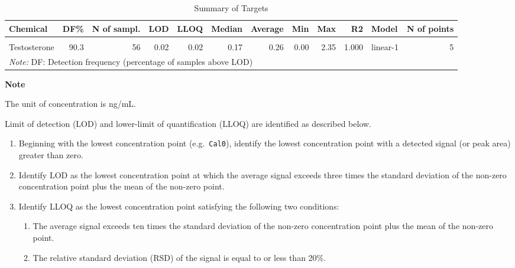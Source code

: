 \documentclass[
  a4paper,
  landscape]{report}
\providecommand{\tightlist}{%
  \setlength{\itemsep}{0pt}\setlength{\parskip}{0pt}}\usepackage{longtable,booktabs,array}
\begin{document}
\begin{longtable}[t]{lrrrrrrrrrlr}
\caption{Summary of Targets}\\
\toprule
Chemical & DF\% & N of sampl. & LOD & LLOQ & Median & Average & Min & Max & R2 & Model & N of points\\
\midrule
\cellcolor{gray!10}{Progesterone} & \cellcolor{gray!10}{100.0} & \cellcolor{gray!10}{62} & \cellcolor{gray!10}{0.02} & \cellcolor{gray!10}{0.02} & \cellcolor{gray!10}{15.99} & \cellcolor{gray!10}{48.46} & \cellcolor{gray!10}{0.16} & \cellcolor{gray!10}{236.59} & \cellcolor{gray!10}{0.994} & \cellcolor{gray!10}{linear-1} & \cellcolor{gray!10}{5}\\
Testosterone & 90.3 & 56 & 0.02 & 0.02 & 0.17 & 0.26 & 0.00 & 2.35 & 1.000 & linear-1 & 5\\
\bottomrule
\multicolumn{12}{l}{\rule{0pt}{1em}\textit{Note: } DF: Detection frequency (percentage of samples above LOD)}\\
\end{longtable}

\textbf{Note}

The unit of concentration is ng/mL.

Limit of detection (LOD) and lower-limit of quantification (LLOQ) are
identified as described below.

\begin{enumerate}
\def\labelenumi{\arabic{enumi}.}
\tightlist
\item
  Beginning with the lowest concentration point (e.g.~\texttt{Cal0}),
  identify the lowest concentration point with a detected signal (or
  peak area) greater than zero.
\item
  Identify LOD as the lowest concentration point at which the average
  signal exceeds three times the standard deviation of the non-zero
  concentration point plus the mean of the non-zero point.
\item
  Identify LLOQ as the lowest concentration point satisfying the
  following two conditions:

  \begin{enumerate}
  \def\labelenumii{\arabic{enumii})}
  \tightlist
  \item
    The average signal exceeds ten times the standard deviation of the
    non-zero concentration point plus the mean of the non-zero point.
  \item
    The relative standard deviation (RSD) of the signal is equal to or
    less than 20\%.
  \end{enumerate}
\end{enumerate}
\end{document}
